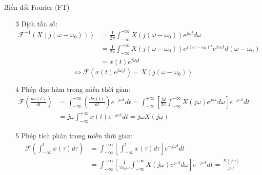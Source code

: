 \documentclass[8pt]{beamer}
\begin{document}
\begin{frame}{Biến đổi Fourier (FT)}
\begin{enumerate}
	\item[3] Dịch tần số:
\begin{equation*}
\begin{split}
	\mathscr{F}^{-1}(X(j(\omega-\omega_{0})))&=\frac{1}{2\pi}\int_{-\infty}^{+\infty}X(j(\omega-\omega_{0}))e^{j\omega t}d\omega \\&=\frac{1}{2\pi}\int_{-\infty}^{+\infty}X(j(\omega-\omega_{0}))e^{j(\omega-\omega_{0})t}e^{j\omega_{0}t}d(\omega-\omega_{0})\\&=x(t)e^{j\omega_{0}t}
\end{split}
\end{equation*}
$$\Leftrightarrow \mathscr{F}(x(t)e^{j\omega_{0}t})=X(j(\omega-\omega_{0}))$$
\item[4] Phép đạo hàm trong miền thời gian:
\begin{equation*}
\begin{split}
	\mathscr{F}\left(\frac{dx(t)}{dt}\right)&=\int_{-\infty}^{+\infty}\left(\frac{dx(t)}{dt}\right)e^{-j\omega t}dt=\int_{-\infty}^{+\infty}\left[\frac{j\omega}{2\pi}\int_{-\infty}^{+\infty}X(j\omega)e^{j\omega t}d\omega\right]e^{-j\omega t}dt\\&= j\omega\int_{-\infty}^{+\infty}x(t)e^{-j\omega t}dt=j\omega X(j\omega)
\end{split}
\end{equation*}
\item[5] Phép tích phân trong miền thời gian:
\begin{equation*}
\begin{split}
	\mathscr{F}\left(\int_{-\infty}^{t}x(\tau)d\tau\right)&=\int_{-\infty}^{+\infty}\left[\int_{-\infty}^{t}x(\tau)d\tau\right]e^{-j\omega t}dt\\
							      &=\int_{-\infty}^{+\infty}\left[\frac{1}{2\pi j\omega}\int_{-\infty}^{+\infty}X(j\omega)e^{j\omega t}d\omega\right]e^{-j\omega t}dt=\frac{X(j\omega)}{j\omega}
\end{split}
\end{equation*}
\end{enumerate}
\end{frame}
\end{document}
